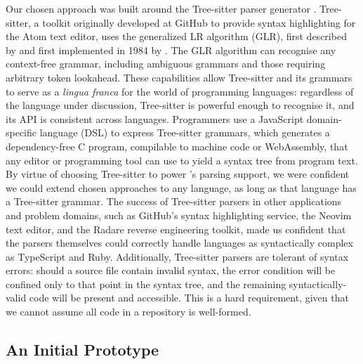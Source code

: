 \documentclass[acmsmall,fleqn]{acmart}
\begin{document}
Our chosen approach was built around the Tree-sitter parser generator
\cite{Brunsfeld18Tree}. Tree-sitter, a toolkit originally developed at GitHub to
provide syntax highlighting for the Atom text editor, uses the generalized LR
algorithm (GLR), first described by \citet{Lang74Deterministic} and first
implemented in 1984 by \citet{Tomita84Efficient}. The GLR algorithm can
recognise any context-free grammar, including ambiguous grammars and those
requiring arbitrary token lookahead. These capabilities allow Tree-sitter and
its grammars to serve as a \emph{lingua franca} for the world of programming
languages: regardless of the language under discussion, Tree-sitter is powerful
enough to recognise it, and its API is consistent across languages. Programmers
use a JavaScript domain-specific language (DSL) to express Tree-sitter grammars,
which generates a dependency-free C program, compilable to machine code or
WebAssembly, that any editor or programming tool can use to yield a syntax tree
from program text. By virtue of choosing Tree-sitter to power \semantic{}’s
parsing support, we were confident we could extend chosen approaches to any
language, as long as that language has a Tree-sitter grammar. The success of
Tree-sitter parsers in other applications and problem domains, such as GitHub's
syntax highlighting service, the Neovim text editor, and the Radare reverse
engineering toolkit, made us confident that the parsers themselves could
correctly handle languages as syntactically complex as TypeScript and Ruby.
Additionally, Tree-sitter parsers are tolerant of syntax errors: should a source
file contain invalid syntax, the error condition will be confined only to that
point in the syntax tree, and the remaining syntactically-valid code will be
present and accessible. This is a hard requirement, given that we cannot
assume all code in a repository is well-formed.

\subsection{An Initial Prototype}
\end{document}
